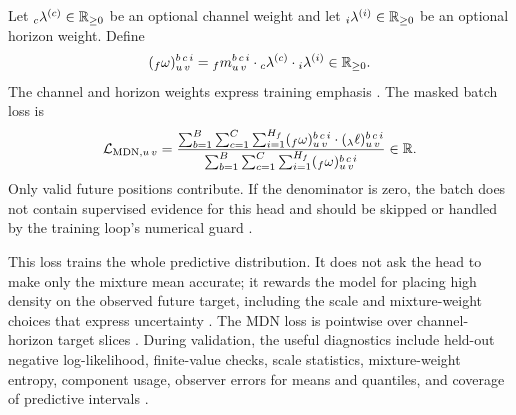 Let ${}_{c}\lambda^{(c)}\in\mathbb{R}_{\ge 0}$ be an optional channel weight and let
${}_{i}\lambda^{(i)}\in\mathbb{R}_{\ge 0}$ be an optional horizon weight.  Define
\[
  ({}_{f}\omega)_{u\,v}^{b\,c\,i}
  =
  {}_{f}m_{u\,v}^{b\,c\,i}
  \cdot
  {}_{c}\lambda^{(c)}
  \cdot
  {}_{i}\lambda^{(i)}
  \in\mathbb{R}_{\ge 0}.
\]
The channel and horizon weights express training emphasis%
.
The masked batch loss is
\[
  \mathcal{L}_{\mathrm{MDN},u\,v}
  =
  \frac{
    \sum_{b=1}^{B}
    \sum_{c=1}^{C}
    \sum_{i=1}^{H_f}
    ({}_{f}\omega)_{u\,v}^{b\,c\,i}\cdot
    ({}_{\lambda}\ell)_{u\,v}^{b\,c\,i}
  }{
    \sum_{b=1}^{B}
    \sum_{c=1}^{C}
    \sum_{i=1}^{H_f}
    ({}_{f}\omega)_{u\,v}^{b\,c\,i}
  }
  \in\mathbb{R}.
\]
Only valid future positions contribute.  If the denominator is zero, the batch
does not contain supervised evidence for this head and should be skipped or
handled by the training loop's numerical guard%
.

This loss trains the whole predictive distribution.  It does not ask the head
to make only the mixture mean accurate; it rewards the model for placing high
density on the observed future target, including the scale and mixture-weight
choices that express uncertainty%
.
The MDN loss is pointwise over channel-horizon target slices%
.
During validation, the useful diagnostics include held-out negative
log-likelihood, finite-value checks, scale statistics, mixture-weight entropy,
component usage, observer errors for means and quantiles, and coverage of
predictive intervals%
.



